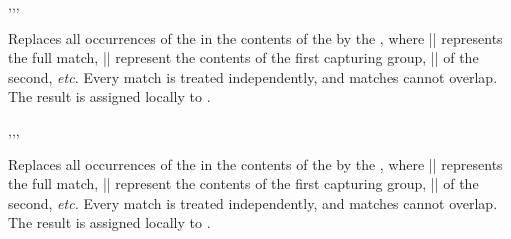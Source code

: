 \documentclass[oneside]{book}
\begin{document}
\begin{function}{\regexReplaceAll,\regexReplaceAllT,\regexReplaceAllF,\regexReplaceAllTF}
\begin{syntax}
   
    
    
     
\end{syntax}
Replaces all occurrences of the  in the
contents of the 
by the , where |\0| represents
the full match, |\1| represent the contents of the first capturing
group, |\2| of the second, \emph{etc.} Every match is treated
independently, and matches cannot overlap.  The result is assigned
locally to .
\end{function}

\begin{function}{\regexVarReplaceAll,\regexVarReplaceAllT,\regexVarReplaceAllF,\regexVarReplaceAllTF}
\begin{syntax}
   
    
    
     
\end{syntax}
Replaces all occurrences of the  in the
contents of the 
by the , where |\0| represents
the full match, |\1| represent the contents of the first capturing
group, |\2| of the second, \emph{etc.} Every match is treated
independently, and matches cannot overlap.  The result is assigned
locally to .
\end{function}
\end{document}
